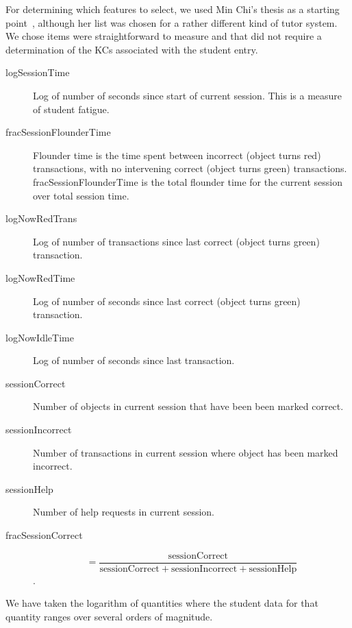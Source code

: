 \documentclass{edm_template}
\begin{document}
For determining which features to select, we used Min Chi's thesis
as a starting point~\citeyear{chi_micro-level_2009}, 
although her list was chosen for a rather different kind of tutor
system.  We chose items were straightforward to measure and that did
not require a determination of the KCs associated with the student entry.
%
\begin{description}

\item[logSessionTime] Log of number of seconds since start of current
  session.  This is a measure of student fatigue.

\item[fracSessionFlounderTime] Flounder time is the time spent between 
incorrect (object turns red) transactions, with no intervening correct 
(object turns green) transactions. 
  fracSessionFlounderTime is the total flounder
time for the current session over total session time.

\item[logNowRedTrans] Log of number of transactions since last
  correct (object turns green) transaction.

\item[logNowRedTime] Log of number of seconds since last
  correct (object turns green) transaction.

\item[logNowIdleTime] Log of number of seconds since last transaction.

\item[sessionCorrect] Number of objects in current session that have
  been  been marked  correct.

\item[sessionIncorrect] Number of transactions in current session where 
   object has been marked  incorrect.

\item[sessionHelp] Number of help requests in current session.

\item[fracSessionCorrect] \[=\frac{\mbox{sessionCorrect}}{\mbox{sessionCorrect}+\mbox{sessionIncorrect}+\mbox{sessionHelp}}\].

\end{description}
%
We have taken the logarithm of quantities where the student data
for that quantity ranges over several orders of magnitude.

\end{document}
